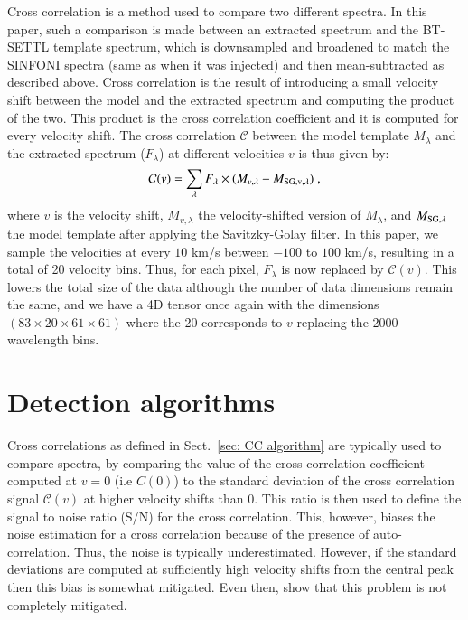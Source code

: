 \documentclass{aa}
\begin{document}
Cross correlation is a method used to compare two different spectra.
In this paper, such a comparison is made between an extracted spectrum and the BT-SETTL template spectrum, which is downsampled and broadened to match the SINFONI spectra (same as when it was injected) and then mean-subtracted as described above.
Cross correlation is the result of introducing a small velocity shift between the model and the extracted spectrum and computing the product of the two.
This product is the cross correlation coefficient and it is computed for every velocity shift.
The cross correlation $\mathcal{C}$ between the model template $M_{\lambda}$ and the extracted spectrum ($F_{\lambda}$) at different velocities $v$ is thus given by:
\begin{equation}
    \mathcal{C}(v) = \sum\limits_{\lambda}F_{\rm{\lambda}}\times (M_{v,\lambda}-M_{\rm{SG},v,\lambda})  \; ,
    \label{eq:CC equation}
\end{equation}
where $v$ is the velocity shift, $M_{v,\lambda}$ the velocity-shifted version of $M_{\lambda}$, and $M_{\rm{SG},\lambda}$ the model template after applying the Savitzky-Golay filter.
In this paper, we sample the velocities at every $10$ km/s between $-100$ to $100$ km/s, resulting in a total of 20 velocity bins. Thus, for each pixel, $F_\lambda$ is now replaced by $\mathcal{C}(v)$. This lowers the total size of the data although the number of data dimensions remain the same, and we have a 4D tensor once again with the dimensions $\left(83\times20\times61\times61\right)$ where the 20 corresponds to $v$ replacing the 2000 wavelength bins.



\section{Detection algorithms}
\label{sec:mapbased}


Cross correlations as defined in Sect.~\ref{sec: CC algorithm} are typically used to compare spectra, by comparing the value of the cross correlation coefficient computed at $v=0$ (i.e $C(0)$) to the standard deviation of the cross correlation signal $\mathcal{C}(v)$ at higher velocity shifts than $0$.
This ratio is then used to define the signal to noise ratio (S/N) for the cross correlation.
This, however, biases the noise estimation for a cross correlation because of the presence of auto-correlation.
Thus, the noise is typically underestimated.
However, if the standard deviations are computed at sufficiently high velocity shifts from the central peak \citep[e.g., for $|v|\ge 250$ km/s in][]{2018AHoeijmakersMM} then this bias is somewhat mitigated.
Even then, \citet{ruffio2019radial} show that this problem is not completely mitigated. 
\end{document}
